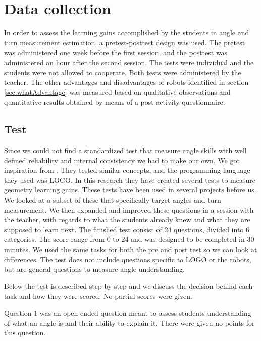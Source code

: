 \chapter{Data collection}
In order to assess the learning gains accomplished by the students in angle and turn measurement estimation, a pretest-posttest design was used. The pretest was administered one week before the first session, and the posttest was administered an hour after the second session. The tests were individual and the students were not allowed to cooperate. Both tests were administered by the teacher. The other advantages and disadvantages of robots identified in section \ref{sec:whatAdvantage} was measured based on qualitative observations and quantitative results obtained by means of a post activity questionnaire.

\section{Test}
Since we could not find a standardized test that measure angle skills with well defined reliability and internal consistency we had to make our own. We got inspiration from \citeauthor{clements2001logo}. They tested similar concepts, and the programming language they used was LOGO. In this research they have created several tests to measure geometry learning gains. These tests have been used in several projects before us. We looked at a subset of these that specifically target angles and turn measurement. We then expanded and improved these questions in a session with the teacher, with regards to what the students already knew and what they are supposed to learn next. 
The finished test consist of 24 questions, divided into 6 categories. The score range from 0 to 24 and was designed to be completed in 30 minutes. We used the same tasks for both the pre and post test so we can look at differences. The test does not include questions specific to LOGO or the robots, but are general questions to measure angle understanding.

\bigskip\noindent
Below the test is described step by step and we discuss the decision behind each task and how they were scored. No partial scores were given.

\bigskip\noindent
Question 1 was an open ended question meant to assess students understanding of what an angle is and their ability to explain it. There were given no points for this question.

